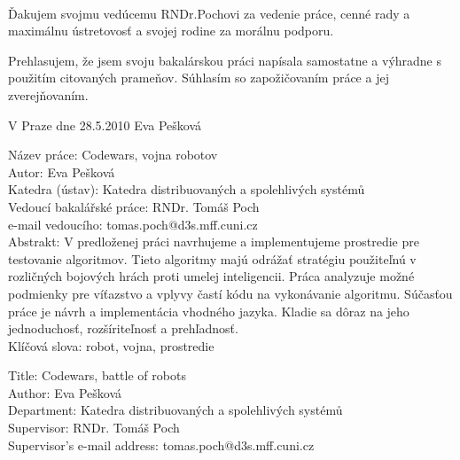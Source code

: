 \documentclass[12pt,notitlepage]{report}
\begin{document}
\normalsize %
\setcounter{page}{2} %

\ \vspace{10mm} 

\noindent Ďakujem svojmu vedúcemu RNDr.Pochovi za vedenie práce, cenné rady a maximálnu ústretovosť a svojej rodine za morálnu podporu. 

\vspace{\fill} %
\noindent Prehlasujem, že jsem svoju bakalárskou práci napísala samostatne a výhradne s použitím citovaných prameňov. Súhlasím so zapožičovaním práce a jej zverejňovaním.

\bigskip
\noindent V Praze dne 28.5.2010 \hspace{\fill}Eva Pešková\\ %


\tableofcontents

\newpage %

\noindent
Název práce: Codewars, vojna robotov\\
Autor: Eva Pešková\\
Katedra (ústav): Katedra distribuovaných a spolehlivých systémů\\
Vedoucí bakalářské práce: RNDr. Tomáš Poch\\
e-mail vedoucího: tomas.poch@d3s.mff.cuni.cz \\

\noindent Abstrakt: V predloženej práci navrhujeme a implementujeme prostredie pre testovanie algoritmov. Tieto algoritmy majú odrážať stratégiu použiteľnú  v rozličných bojových hrách proti umelej inteligencii. Práca analyzuje možné podmienky pre víťazstvo a vplyvy častí kódu na vykonávanie algoritmu. Súčasťou práce je návrh a implementácia vhodného jazyka. Kladie sa dôraz na jeho jednoduchosť, rozšíriteľnosť a prehľadnosť.\\
\newline
\noindent Klíčová slova: robot, vojna, prostredie

\vspace{10mm}

\noindent
Title: Codewars, battle of robots\\
Author: Eva Pešková\\
Department: Katedra distribuovaných a spolehlivých systémů\\
Supervisor: RNDr. Tomáš Poch\\
Supervisor's e-mail address: tomas.poch@d3s.mff.cuni.cz \\
\end{document}
